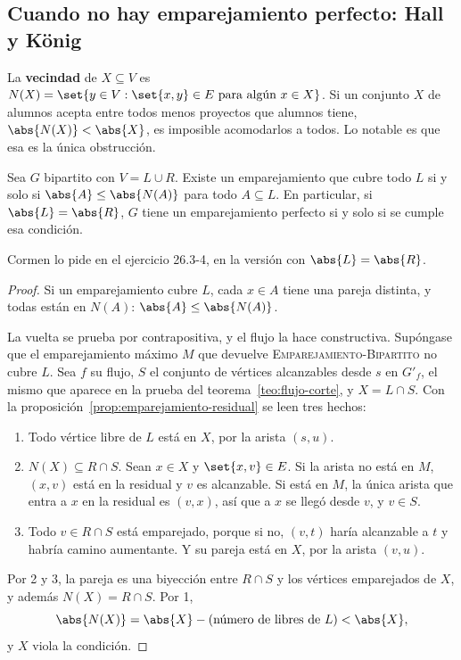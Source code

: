 \documentclass[11pt,letterpaper]{article}
\begin{document}

\subsection*{Cuando no hay emparejamiento perfecto: Hall y König}

La \textbf{vecindad} de $X \subseteq V$ es
$N(X) = \set{y \in V : \set{x, y} \in E \text{ para algún }
x \in X}$. Si un conjunto $X$ de alumnos acepta entre todos menos
proyectos que alumnos tiene, $\abs{N(X)} < \abs{X}$, es imposible
acomodarlos a todos. Lo notable es que esa es la única obstrucción.

\begin{teorema}[Hall]
  \label{teo:emparejamiento-hall}
  Sea $G$ bipartito con $V = L \cup R$. Existe un emparejamiento que
  cubre todo $L$ si y solo si $\abs{A} \le \abs{N(A)}$ para todo
  $A \subseteq L$. En particular, si $\abs{L} = \abs{R}$, $G$ tiene
  un emparejamiento perfecto si y solo si se cumple esa condición.
\end{teorema}

Cormen lo pide en el ejercicio 26.3-4, en la versión con
$\abs{L} = \abs{R}$.

\begin{proof}
  Si un emparejamiento cubre $L$, cada $x \in A$ tiene una pareja
  distinta, y todas están en $N(A)$: $\abs{A} \le \abs{N(A)}$.

  La vuelta se prueba por contrapositiva, y el flujo la hace
  constructiva. Supóngase que el emparejamiento máximo $M$ que
  devuelve \textsc{Emparejamiento-Bipartito} no cubre $L$. Sea $f$
  su flujo, $S$ el conjunto de vértices alcanzables desde $s$ en
  $G'_f$, el mismo que aparece en la prueba del
  teorema~\ref{teo:flujo-corte}, y $X = L \cap S$. Con la
  proposición~\ref{prop:emparejamiento-residual} se leen tres hechos:
  \begin{enumerate}
    \item Todo vértice libre de $L$ está en $X$, por la arista
      $(s, u)$.
    \item $N(X) \subseteq R \cap S$. Sean $x \in X$ y
      $\set{x, v} \in E$. Si la arista no está en $M$, $(x, v)$ está
      en la residual y $v$ es alcanzable. Si está en $M$, la única
      arista que entra a $x$ en la residual es $(v, x)$, así que a
      $x$ se llegó desde $v$, y $v \in S$.
    \item Todo $v \in R \cap S$ está emparejado, porque si no,
      $(v, t)$ haría alcanzable a $t$ y habría camino aumentante. Y
      su pareja está en $X$, por la arista $(v, u)$.
  \end{enumerate}
  Por 2 y 3, la pareja es una biyección entre $R \cap S$ y los
  vértices emparejados de $X$, y además $N(X) = R \cap S$. Por 1,
  \[
    \abs{N(X)} = \abs{X} - (\text{número de libres de } L)
               < \abs{X} ,
  \]
  y $X$ viola la condición.
\end{proof}
\end{document}
